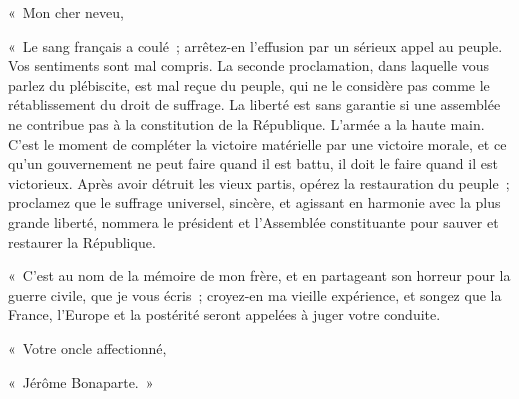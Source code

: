 \documentclass[french,twoside]{book} %
\newenvironment{quoteblock}%
  {\begin{quoting}}
  {\end{quoting}}
\newenvironment{quotebar}{%
    \def\FrameCommand{{\color{rubric!10!}\vrule width 0.5em} \hspace{0.9em}}%
    \def\OuterFrameSep{\itemsep} %
    \MakeFramed {\advance\hsize-\width \FrameRestore}
  }%
  {%
    \endMakeFramed
  }
\renewenvironment{quoteblock}%
  {%
    \savenotes
    \setstretch{0.9}
    \normalfont
    \begin{quotebar}
  }
  {%
    \end{quotebar}
    \spewnotes
  }
\begin{document}
\begin{quoteblock}
 \noindent « Mon cher neveu,\par
 « Le sang français a coulé ; arrêtez-en l’effusion par un sérieux appel au peuple. Vos sentiments sont mal compris. La seconde proclamation, dans laquelle vous parlez du plébiscite, est mal reçue du peuple, qui ne le considère pas comme le rétablissement du droit de suffrage. La liberté est sans garantie si une assemblée ne contribue pas à la constitution de la République. L’armée a la haute main. C’est le moment de compléter la victoire matérielle par une victoire morale, et ce qu’un gouvernement ne peut faire quand il est battu, il doit le faire quand il est victorieux. Après avoir détruit les vieux partis, opérez la restauration du peuple ; proclamez que le suffrage universel, sincère, et agissant en harmonie avec la plus grande liberté, nommera le président et l’Assemblée constituante pour sauver et restaurer la République.\par
 « C’est au nom de la mémoire de mon frère, et en partageant son horreur pour la guerre civile, que je vous écris ; croyez-en ma vieille expérience, et songez que la France, l’Europe et la postérité seront appelées à juger votre conduite.\par
 « Votre oncle affectionné,\par
 « Jérôme Bonaparte. »
 \end{quoteblock}
\end{document}
